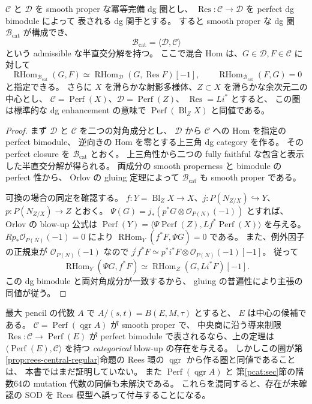 \begin{theorem}\label{thm:restored-categorical-gluing}
$\mathcal C$ と $\mathcal D$ を smooth proper な冪等完備 dg 圏とし、
$\operatorname{Res}:\mathcal C\to\mathcal D$ を perfect dg bimodule によって
表される dg 関手とする。
すると smooth proper な dg 圏 $\mathcal B_{\mathrm{cat}}$ が構成でき、
\[
 \mathcal B_{\mathrm{cat}}
 =\langle\mathcal D,\mathcal C\rangle
\]
という admissible な半直交分解を持つ。
ここで混合 Hom は、$G\in\mathcal D,F\in\mathcal C$ に対して
\[
\operatorname{RHom}_{\mathcal B_{\mathrm{cat}}}(G,F)
 \simeq\operatorname{RHom}_{\mathcal D}(G,\operatorname{Res}F)[-1],
\qquad
\operatorname{RHom}_{\mathcal B_{\mathrm{cat}}}(F,G)=0
\]
と指定できる。
さらに $X$ を滑らかな射影多様体、$Z\subset X$ を滑らかな余次元二の中心とし、
$\mathcal C=\operatorname{Perf}(X)$、$\mathcal D=\operatorname{Perf}(Z)$、
$\operatorname{Res}=Li^*$ とすると、
この圏は標準的な dg enhancement の意味で
$\operatorname{Perf}(\operatorname{Bl}_Z X)$ と同値である。
\end{theorem}
\begin{proof}
まず $\mathcal D$ と $\mathcal C$ を二つの対角成分とし、
$\mathcal D$ から $\mathcal C$ への Hom を指定の perfect bimodule、
逆向きの Hom を零とする上三角 dg category を作る。
その perfect closure を $\mathcal B_{\mathrm{cat}}$ とおく。
上三角性から二つの fully faithful な包含と表示した半直交分解が得られる。
両成分の smooth properness と bimodule の perfect 性から、
Orlov の gluing 定理\cite{PencilOrlovGluing}によって
$\mathcal B_{\mathrm{cat}}$ も smooth proper である。

可換の場合の同定を確認する。
$f:Y=\operatorname{Bl}_Z X\to X$、$j:P(N_{Z/X})\hookrightarrow Y$、
$p:P(N_{Z/X})\to Z$ とおく。
$\Psi(G)=j_*(p^*G\otimes\mathcal O_{P(N)}(-1))$ とすれば、
Orlov の blow-up 公式は
$\operatorname{Perf}(Y)=\langle\Psi\operatorname{Perf}(Z),
Lf^*\operatorname{Perf}(X)\rangle$ を与える\cite{OrlovBlowup}。
$Rp_*\mathcal O_{P(N)}(-1)=0$ により
$\operatorname{RHom}_Y(f^*F,\Psi G)=0$ である。
また、例外因子の正規束が $\mathcal O_{P(N)}(-1)$ なので
$j^!f^*F\simeq p^*i^*F\otimes\mathcal O_{P(N)}(-1)[-1]$。
従って
\[
\operatorname{RHom}_Y(\Psi G,f^*F)
 \simeq\operatorname{RHom}_{Z}(G,Li^*F)[-1].
\]
この dg bimodule と両対角成分が一致するから、
gluing の普遍性により主張の同値が従う。
\end{proof}

\begin{remark}\label{rem:restored-sod-scope}
最大 pencil の代数 $A$ で $A/(s,t)=B(E,M,\tau)$ とすると、
$E$ は中心の候補である。
$\mathcal C=\operatorname{Perf}(\operatorname{qgr}A)$ が smooth proper で、
中央商に沿う導来制限 $\operatorname{Res}:\mathcal C\to\operatorname{Perf}(E)$ が
perfect bimodule で表されるなら、上の定理は
$\langle\operatorname{Perf}(E),\mathcal C\rangle$ を持つ
\emph{categorical} blow-up の存在を与える。
しかしこの圏が第\ref{prop:rees-central-regular}命題の
Rees 環の $\operatorname{qgr}$ から作る圏と同値であることは、
本書ではまだ証明していない。
また $\operatorname{Perf}(\operatorname{qgr}A)$ と
第\ref{pcat:sec}節の階数64の mutation 代数の同値も未解決である。
これらを混同すると、存在が未確認の SOD を Rees 模型へ誤って付与することになる。
\end{remark}

